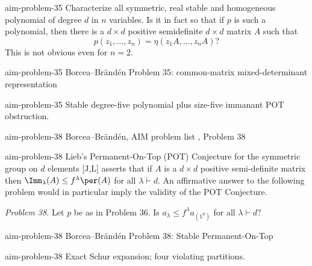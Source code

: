 \begin{cxstatement}{aim-problem-35}
Characterize all symmetric, real stable and homogeneous polynomial of degree $d$ in $n$ variables.  Is it in fact so that if $p$ is such a polynomial, then there is a $d\times d$ positive semidefinite $d\times d$ matrix $A$ such that
\[p(z_1,\ldots,z_n)=\eta(z_1A,\ldots,z_nA)?\]
This is not obvious even for $n=2$.
\end{cxstatement}

\begin{cxsummary}{aim-problem-35}
Borcea--Br\"and\'en Problem 35: common-matrix mixed-determinant representation \citeyearpar{AIMStableProblems}
\end{cxsummary}

\begin{cxcertificate}{aim-problem-35}
Stable degree-five polynomial plus size-five immanant POT obstruction.
\end{cxcertificate}


\begin{cxsource}{aim-problem-38}
Borcea--Br\"and\'en, AIM problem list \citeyearpar{AIMStableProblems}, Problem 38
\end{cxsource}

\begin{cxstatement}{aim-problem-38}
Lieb's Permanent-On-Top (POT) Conjecture for the symmetric group on $d$ elements [J,L] asserts that if $A$ is a $d\times d$ positive semi-definite matrix then $\Imm_\lambda(A)\le f^\lambda\per(A)$ for all $\lambda\vdash d$.  An affirmative answer to the following problem would in particular imply the validity of the POT Conjecture.

\emph{Problem 38.}  Let $p$ be as in Problem 36.  Is $a_\lambda\le f^\lambda a_{(1^d)}$ for all $\lambda\vdash d$?
\end{cxstatement}

\begin{cxsummary}{aim-problem-38}
Borcea--Br\"and\'en Problem 38: Stable Permanent-On-Top \citeyearpar{AIMStableProblems}
\end{cxsummary}

\begin{cxcertificate}{aim-problem-38}
Exact Schur expansion; four violating partitions.
\end{cxcertificate}

